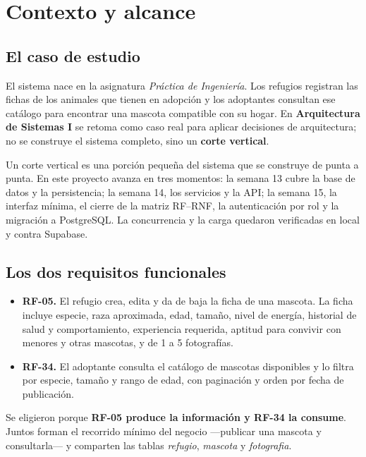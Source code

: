 \documentclass[11pt,a4paper]{article}
\begin{document}
\section{Contexto y alcance}

\subsection{El caso de estudio}

El sistema nace en la asignatura \emph{Práctica de Ingeniería}. Los refugios
registran las fichas de los animales que tienen en adopción y los adoptantes
consultan ese catálogo para encontrar una mascota compatible con su hogar. En
\textbf{Arquitectura de Sistemas I} se retoma como caso real para aplicar
decisiones de arquitectura; no se construye el sistema completo, sino un
\textbf{corte vertical}.

Un corte vertical es una porción pequeña del sistema que se construye de punta a
punta. En este proyecto avanza en tres momentos: la semana 13 cubre la base de
datos y la persistencia; la semana 14, los servicios y la API; la semana 15, la
interfaz mínima, el cierre de la matriz RF--RNF, la autenticación por rol y la
migración a PostgreSQL. La concurrencia y la carga quedaron verificadas en
local y contra Supabase.

\subsection{Los dos requisitos funcionales}

\begin{itemize}
\item \textbf{RF-05.} El refugio crea, edita y da de baja la ficha de una
  mascota. La ficha incluye especie, raza aproximada, edad, tamaño, nivel de
  energía, historial de salud y comportamiento, experiencia requerida, aptitud
  para convivir con menores y otras mascotas, y de 1 a 5 fotografías.
\item \textbf{RF-34.} El adoptante consulta el catálogo de mascotas disponibles
  y lo filtra por especie, tamaño y rango de edad, con paginación y orden por
  fecha de publicación.
\end{itemize}

Se eligieron porque \textbf{RF-05 produce la información y RF-34 la consume}.
Juntos forman el recorrido mínimo del negocio ---publicar una mascota y
consultarla--- y comparten las tablas \emph{refugio}, \emph{mascota} y
\emph{fotografia}.
\end{document}
